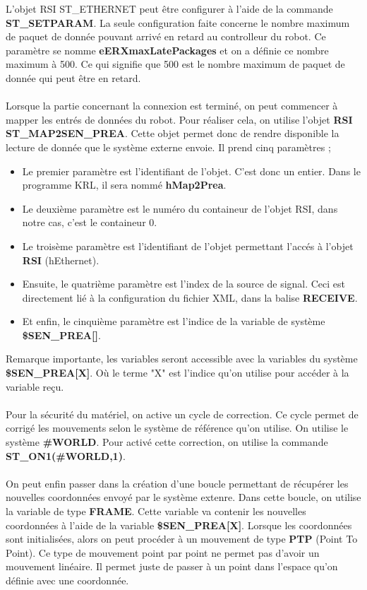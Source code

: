 L'objet RSI ST\_ETHERNET peut être configurer à l'aide de la commande \textbf{ST\_SETPARAM}.
La seule configuration faite concerne le nombre maximum de paquet de donnée pouvant arrivé en retard au controlleur du robot.
Ce paramètre se nomme \textbf{eERXmaxLatePackages} et on a définie ce nombre maximum à 500.
Ce qui signifie que 500 est le nombre maximum de paquet de donnée qui peut être en retard.
\\
\\
Lorsque la partie concernant la connexion est terminé, on peut commencer à mapper les entrés de données du robot.
Pour réaliser cela, on utilise l'objet \textbf{RSI ST\_MAP2SEN\_PREA}.
Cette objet permet donc de rendre disponible la lecture de donnée que le système externe envoie.
Il prend cinq paramètres ;
\begin{itemize}
    \item Le premier paramètre est l'identifiant de l'objet. C'est donc un entier. Dans le programme KRL, il sera nommé \textbf{hMap2Prea}.
    \item Le deuxième paramètre est le numéro du containeur de l'objet RSI, dans notre cas, c'est le containeur 0.
    \item Le troisème paramètre est l'identifiant de l'objet permettant l'accés à l'objet \textbf{RSI} (hEthernet).
    \item Ensuite, le quatrième paramètre est l'index de la source de signal. Ceci est directement lié à la configuration du fichier XML, dans la balise \textbf{RECEIVE}.
    \item Et enfin, le cinquième paramètre est l'indice de la variable de système \textbf{\$SEN\_PREA[]}.
\end{itemize}
Remarque importante, les variables seront accessible avec la variables du système \textbf{\$SEN\_PREA[X]}.
Où le terme "X" est l'indice qu'on utilise pour accéder à la variable reçu.
\\
\\
Pour la sécurité du matériel, on active un cycle de correction.
Ce cycle permet de corrigé les mouvements selon le système de référence qu'on utilise.
On utilise le système \textbf{\#WORLD}.
Pour activé cette correction, on utilise la commande \textbf{ST\_ON1(\#WORLD,1)}.
\\
\\
On peut enfin passer dans la création d'une boucle permettant de récupérer les nouvelles coordonnées envoyé par le système extenre.
Dans cette boucle, on utilise la variable de type \textbf{FRAME}.
Cette variable va contenir les nouvelles coordonnées à l'aide de la variable \textbf{\$SEN\_PREA[X]}.
Lorsque les coordonnées sont initialisées, alors on peut procéder à un mouvement de type \textbf{PTP} (Point To Point).
Ce type de mouvement point par point ne permet pas d'avoir un mouvement linéaire.
Il permet juste de passer à un point dans l'espace qu'on définie avec une coordonnée.

